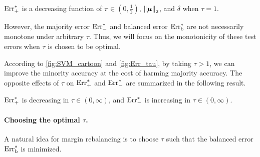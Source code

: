 


\begin{prop}\label{prop:Err-_mono}
    $\mathrm{Err}_{+}^*$ is a decreasing function of $\pi \in (0, \frac12)$, $\left\|{\text{\boldmath $\mu$}}\right\|_2$, and $\delta$ when $\tau = 1$.
\end{prop}

However, the majority error $\mathrm{Err}_{-}^*$ and balanced error $\mathrm{Err}_\mathrm{b}^*$ are not necessarily monotone under arbitrary $\tau$. Thus, we will focus on the monotonicity of these test errors when $\tau$ is chosen to be optimal.


According to \cref{fig:SVM_cartoon} and \ref{fig:Err_tau}, by taking $\tau > 1$, we can improve the minority accuracy at the cost of harming majority accuracy. The opposite effects of $\tau$ on $\mathrm{Err}^*_+$ and $\mathrm{Err}^*_-$ are summarized in the following result.

\begin{prop}\label{prop:tau_mono}
    $\mathrm{Err}^*_+$ is decreasing in $\tau \in (0, \infty)$, and $\mathrm{Err}^*_-$ is increasing in $\tau \in (0, \infty)$.
\end{prop}

\paragraph{Choosing the optimal $\tau$.} A natural idea for margin rebalancing is to choose $\tau$ such that the balanced error $\mathrm{Err}_\mathrm{b}^*$ is minimized.

